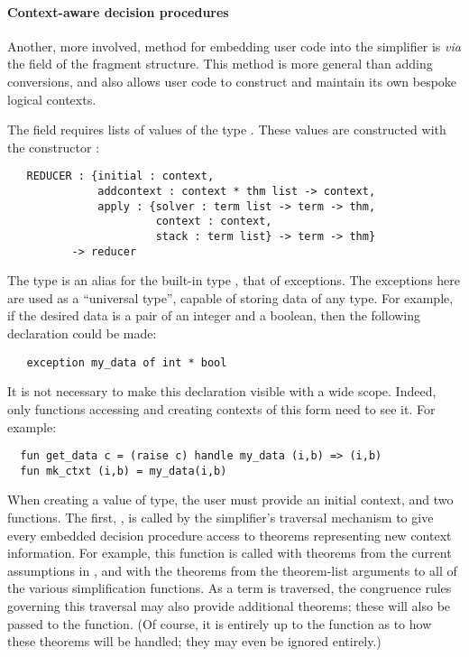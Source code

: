 {\paragraph{Context-aware decision procedures}
Another, more involved, method for embedding user code into the
simplifier is \emph{via} the  field of the \simpset{}
fragment structure.  This method is more general than adding
conversions, and also allows user code to construct and maintain its
own bespoke logical contexts.

The  field requires lists of values of the type
.  These values are constructed with the
constructor :
\begin{hol}
\begin{verbatim}
   REDUCER : {initial : context,
              addcontext : context * thm list -> context,
              apply : {solver : term list -> term -> thm,
                       context : context,
                       stack : term list} -> term -> thm}
          -> reducer
\end{verbatim}
\end{hol}
The  type is an alias for the built-in \ML{} type
, that of exceptions.  The exceptions here are used as a
``universal type'', capable of storing data of any type.  For example,
if the desired data is a pair of an integer and a boolean, then the
following declaration could be made:
\begin{hol}
\begin{verbatim}
   exception my_data of int * bool
\end{verbatim}
\end{hol}
It is not necessary to make this declaration visible with a wide
scope.  Indeed, only functions accessing and creating contexts of this
form need to see it. For example:
\begin{hol}
\begin{verbatim}
  fun get_data c = (raise c) handle my_data (i,b) => (i,b)
  fun mk_ctxt (i,b) = my_data(i,b)
\end{verbatim}
\end{hol}

When creating a value of  type, the user must provide an
initial context, and two functions.  The first, , is
called by the simplifier's traversal mechanism to give every embedded
decision procedure access to theorems representing new context
information.  For example, this function is called with theorems from
the current assumptions in , and with the theorems
from the theorem-list arguments to all of the various simplification
functions.  As a term is traversed, the congruence rules governing
this traversal may also provide additional theorems; these will also
be passed to the  function.  (Of course, it is entirely
up to the  function as to how these theorems will be
handled; they may even be ignored entirely.)

}
